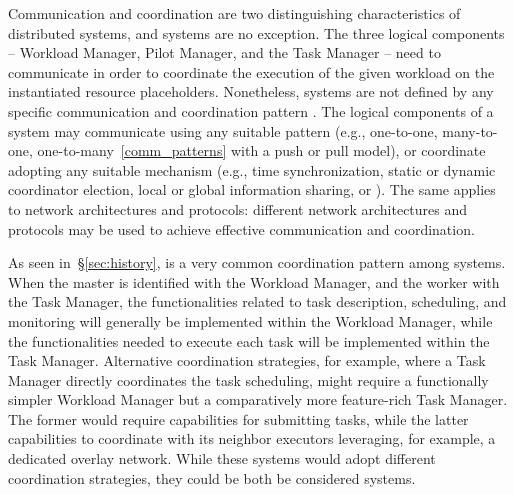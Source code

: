 \documentclass{sig-alternate}
\begin{document}

Communication and coordination are two distinguishing characteristics of
distributed systems, and \pilotjob systems are no exception. The three logical
components -- Workload Manager, Pilot Manager, and the Task Manager -- need to
communicate in order to coordinate the execution of the given workload on the
instantiated resource placeholders.  Nonetheless, \pilotjob systems are not
defined by any specific communication and coordination pattern . The logical
components of a \pilotjob system may communicate using any suitable pattern
(e.g., one-to-one, many-to-one, one-to-many~\ref{comm_patterns} with a push or
pull model), or coordinate adopting any suitable mechanism (e.g., time
synchronization, static or dynamic coordinator election, local or global
information sharing, or \MW). The same applies to network architectures and
protocols: different network architectures and protocols may be used to achieve
effective communication and coordination.


As seen in~\S\ref{sec:history}, \MW is a very common coordination pattern among
\pilotjob systems. When the master is identified with the Workload Manager, and
the worker with the Task Manager, the functionalities related to task
description, scheduling, and monitoring will generally be implemented within the
Workload Manager, while the functionalities needed to execute each task will be
implemented within the Task Manager. Alternative coordination strategies, for
example, where a Task Manager directly coordinates the task scheduling, might
require a functionally simpler Workload Manager but a comparatively more
feature-rich Task Manager. The former would require capabilities for submitting
tasks, while the latter capabilities to coordinate with its neighbor executors
leveraging, for example, a dedicated overlay network. While these systems would
adopt different coordination strategies, they could be both be considered
\pilotjob systems.
\end{document}
